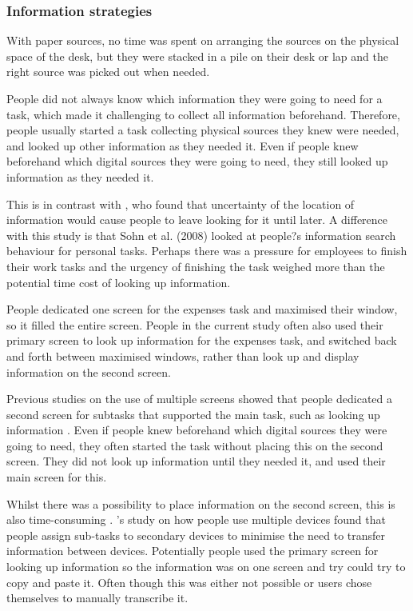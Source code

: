 \subsubsection{Information strategies}
With paper sources, no time was spent on arranging the sources on the physical space of the desk, but they were stacked in a pile on their desk or lap and the right source was picked out when needed.

People did not always know which information they were going to need for a task, which made it challenging to collect all information beforehand. Therefore, people usually started a task collecting physical sources they knew were needed, and looked up other information as they needed it. Even if people knew beforehand which digital sources they were going to need, they still looked up information as they needed it.

This is in contrast with \citet{Sohn2008}, who found that uncertainty of the location of information would cause people to leave looking for it until later. A difference with this study is that Sohn et al. (2008) looked at people?s information search behaviour for personal tasks. Perhaps there was a pressure for employees to finish their work tasks and the urgency of finishing the task weighed more than the potential time cost of looking up information.

People dedicated one screen for the expenses task and maximised their window, so it filled the entire screen. People in the current study often also used their primary screen to look up information for the expenses task, and switched back and forth between maximised windows, rather than look up and display information on the second screen. 

Previous studies on the use of multiple screens showed that people dedicated a second screen for subtasks that supported the main task, such as looking up information \citep{Bi2009, Dearman2008, Grudin2001}. Even if people knew beforehand which digital sources they were going to need, they often started the task without placing this on the second screen. They did not look up information until they needed it, and used their main screen for this.

Whilst there was a possibility to place information on the second screen, this is also time-consuming \citep{Bardram2006}. 
\citet{Dearman}'s study on how people use multiple devices found that people assign sub-tasks to secondary devices to minimise the need to transfer information between devices. Potentially people used the primary screen for looking up information so the information was on one screen and try could try to copy and paste it. Often though this was either not possible or users chose themselves to manually transcribe it.
 
